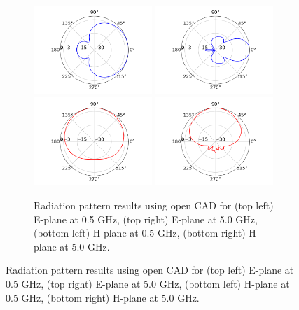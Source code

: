 \documentclass[10pt]{amsart}
\theoremstyle{definition}
\numberwithin{equation}{section}
\begin{document}
\begin{figure}[ht]
\centering
\begin{subfigure}{0.65\textwidth}
    \includegraphics[width=0.49\textwidth]{figures/3DHorn_CAD_0_5GHz_E_plane.png}
	\includegraphics[width=0.49\textwidth]{figures/3DHorn_CAD_5GHz_E_plane.png} \\
	\includegraphics[width=0.49\textwidth]{figures/3DHorn_CAD_0_5GHz_H_plane.png}
	\includegraphics[width=0.49\textwidth]{figures/3DHorn_CAD_5GHz_H_plane.png}
    \caption{Radiation pattern results using open CAD for (top left) E-plane at 0.5 GHz, (top right) E-plane at 5.0 GHz, (bottom left) H-plane at 0.5 GHz, (bottom right) H-plane at 5.0 GHz.}

\end{subfigure}
\end{figure}
\end{document}
